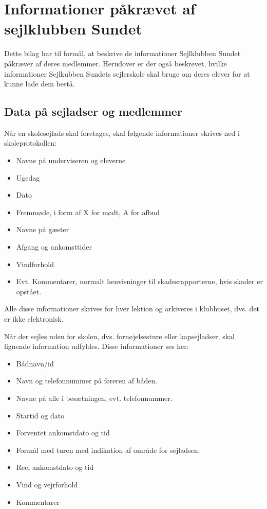 \chapter{Informationer påkrævet af sejlklubben Sundet}\label{bilag:sundet}
Dette bilag har til formål, at beskrive de informationer Sejlklubben Sundet påkræver af deres medlemmer. 
Herudover er der også beskrevet, hvilke informationer Sejlkubben Sundets sejlerskole skal bruge om deres elever for at kunne lade dem bestå.

\section{Data på sejladser og medlemmer}

Når en skolesejlads skal foretages, skal følgende informationer skrives ned i skoleprotokollen:

\begin{itemize}
	\item Navne på underviseren og eleverne
	\item Ugedag
	\item Dato
	\item Fremmøde, i form af X for mødt, A for afbud
	\item Navne på gæster
	\item Afgang og ankomsttider
	\item Vindforhold
	\item Evt. Kommentarer, normalt henvisninger til skadesrapporterne, hvis skader er opstået.
\end{itemize}

Alle disse informationer skrives for hver lektion og arkiveres i klubhuset, dvs. det er ikke elektronisk.

Når der sejles uden for skolen, dvs. fornøjelsesture eller kapsejladser, skal lignende information udfyldes. 
Disse informationer ses her:

\begin{itemize}
	\item Bådnavn/id
	\item Navn og telefonnummer på føreren af båden.
	\item Navne på alle i besætningen, evt. telefonnummer.
	\item Startid og dato
	\item Forventet ankomstdato og tid
	\item Formål med turen med indikation af område for sejladsen.
	\item Reel ankomstdato og tid
	\item Vind og vejrforhold
	\item Kommentarer
\end{itemize}

